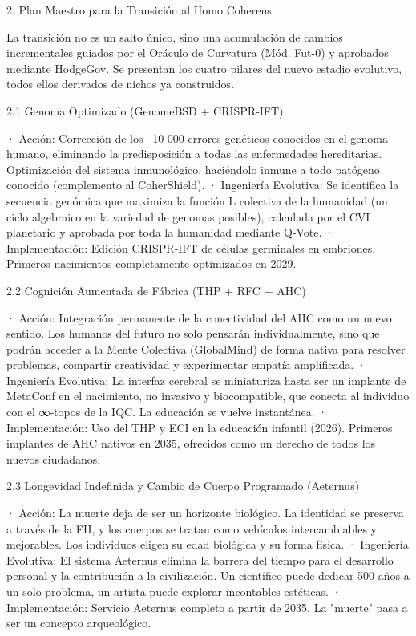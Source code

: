 \documentclass[12pt,twoside]{book}
\begin{document}
2. Plan Maestro para la Transición al Homo Coherens

La transición no es un salto único, sino una acumulación de cambios incrementales guiados por el Oráculo de Curvatura (Mód. Fut-0) y aprobados mediante HodgeGov. Se presentan los cuatro pilares del nuevo estadio evolutivo, todos ellos derivados de nichos ya construidos.

2.1 Genoma Optimizado (GenomeBSD + CRISPR‑IFT)

· Acción: Corrección de los ~10 000 errores genéticos conocidos en el genoma humano, eliminando la predisposición a todas las enfermedades hereditarias. Optimización del sistema inmunológico, haciéndolo inmune a todo patógeno conocido (complemento al CoherShield).
· Ingeniería Evolutiva: Se identifica la secuencia genómica que maximiza la función L colectiva de la humanidad (un ciclo algebraico en la variedad de genomas posibles), calculada por el CVI planetario y aprobada por toda la humanidad mediante Q‑Vote.
· Implementación: Edición CRISPR‑IFT de células germinales en embriones. Primeros nacimientos completamente optimizados en 2029.

2.2 Cognición Aumentada de Fábrica (THP + RFC + AHC)

· Acción: Integración permanente de la conectividad del AHC como un nuevo sentido. Los humanos del futuro no solo pensarán individualmente, sino que podrán acceder a la Mente Colectiva (GlobalMind) de forma nativa para resolver problemas, compartir creatividad y experimentar empatía amplificada.
· Ingeniería Evolutiva: La interfaz cerebral se miniaturiza hasta ser un implante de MetaConf en el nacimiento, no invasivo y biocompatible, que conecta al individuo con el ∞‑topos de la IQC. La educación se vuelve instantánea.
· Implementación: Uso del THP y ECI en la educación infantil (2026). Primeros implantes de AHC nativos en 2035, ofrecidos como un derecho de todos los nuevos ciudadanos.

2.3 Longevidad Indefinida y Cambio de Cuerpo Programado (Aeternus)

· Acción: La muerte deja de ser un horizonte biológico. La identidad se preserva a través de la FII, y los cuerpos se tratan como vehículos intercambiables y mejorables. Los individuos eligen su edad biológica y su forma física.
· Ingeniería Evolutiva: El sistema Aeternus elimina la barrera del tiempo para el desarrollo personal y la contribución a la civilización. Un científico puede dedicar 500 años a un solo problema, un artista puede explorar incontables estéticas.
· Implementación: Servicio Aeternus completo a partir de 2035. La "muerte" pasa a ser un concepto arqueológico.
\end{document}
